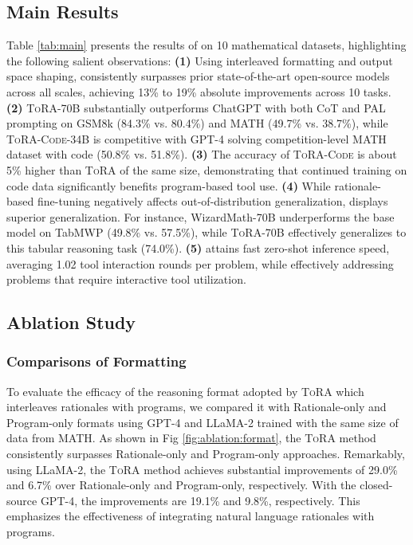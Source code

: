 \subsection{Main Results}
\label{sec:exps:main_res}

Table \ref{tab:main} presents the results of  on 10 mathematical datasets, highlighting the following salient observations:
\textbf{(1)} Using interleaved formatting and output space shaping,  consistently surpasses prior state-of-the-art open-source models across all scales, achieving 13\% to 19\% absolute improvements across 10 tasks.
\textbf{(2)} \textsc{ToRA}-70B substantially outperforms ChatGPT with both CoT and PAL prompting on GSM8k (84.3\% vs. 80.4\%) and MATH (49.7\% vs. 38.7\%), while \textsc{ToRA-Code}-34B is competitive with GPT-4 solving competition-level MATH dataset with code (50.8\% vs. 51.8\%).
\textbf{(3)} The accuracy of \textsc{ToRA-Code} is about 5\% higher than \textsc{ToRA} of the same size, demonstrating that continued training on code data significantly benefits program-based tool use.
\textbf{(4)} While rationale-based fine-tuning negatively affects out-of-distribution generalization,  displays superior generalization. For instance, WizardMath-70B underperforms the base model on TabMWP (49.8\% vs. 57.5\%), while \textsc{ToRA}-70B effectively generalizes to this tabular reasoning task (74.0\%).
\textbf{(5)}  attains fast zero-shot inference speed, averaging 1.02 tool interaction rounds per problem, while effectively addressing problems that require interactive tool utilization.

\subsection{Ablation Study}

\subsubsection{Comparisons of Formatting} To evaluate the efficacy of the reasoning format adopted by \textsc{ToRA} which interleaves rationales with programs, we compared it with Rationale-only and Program-only formats using GPT-4 and LLaMA-2 trained with the same size of data from MATH. As shown in Fig \ref{fig:ablation:format}, the \textsc{ToRA} method consistently surpasses Rationale-only and Program-only approaches. Remarkably, using LLaMA-2, the \textsc{ToRA} method achieves substantial improvements of 29.0\% and 6.7\% over Rationale-only and Program-only, respectively. With the closed-source GPT-4, the improvements are 19.1\% and 9.8\%, respectively. This emphasizes the effectiveness of integrating natural language rationales with programs.

